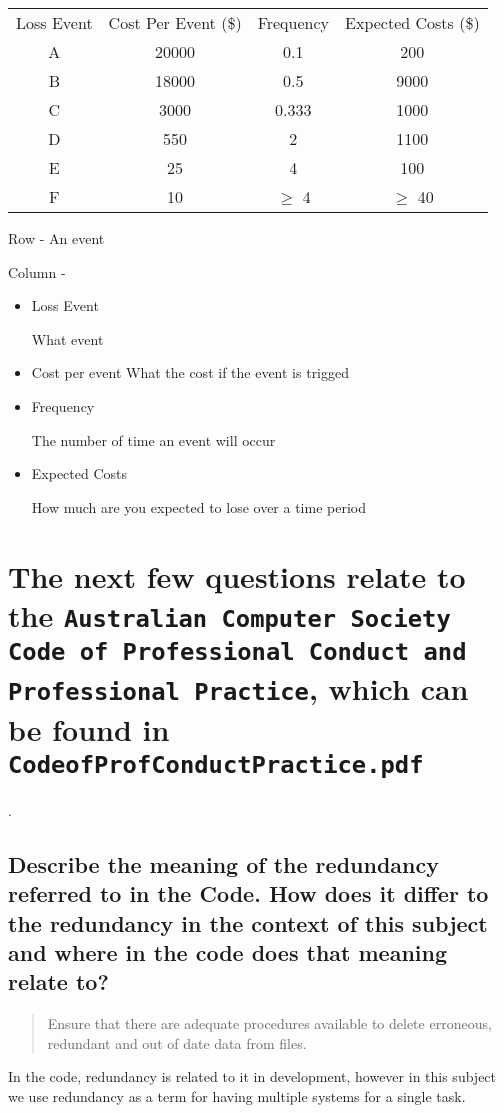 \documentclass{article}
\begin{document}
\begin{tabular}{c|c|c|c}
\hline
Loss Event &  Cost Per Event (\$) & Frequency  & Expected Costs (\$) \\
A & 20000 & 0.1 & 200\\
B & 18000 & 0.5 & 9000\\
C & 3000 & 0.333 & 1000 \\
D & 550 & 2 & 1100\\
E & 25 & 4 & 100\\
F & 10 & $\ge$ 4 & $\ge$ 40\\
\end{tabular}

Row - An event

Column - 

\begin{itemize}
\item Loss Event

What event
\item Cost per event
What the cost if the event is trigged
\item Frequency

The number of time an event will occur

\item Expected Costs

How much are you expected to lose over a time period
\end{itemize}

\section[Code Of Conduct]{The next few questions relate to the \texttt{Australian Computer Society Code of Professional Conduct and Professional Practice}, which can be found in \texttt{CodeofProfConductPractice.pdf}}.

\subsection{Describe the meaning of the redundancy referred to in the Code. How does it differ to the redundancy in the context of this subject and where in the code does that meaning relate to?}


\begin{quote}
Ensure that there are adequate procedures available to delete erroneous, redundant 
and out of date data from files. 
\end{quote}

In the code, redundancy is related to it in development, however in this subject we use redundancy as a term for having multiple systems for a single task. 
\end{document}
